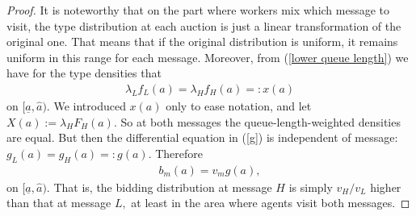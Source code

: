 \documentclass[12pt]{article}
\begin{document}
\begin{proof}
It is noteworthy that on the part where workers mix which message to visit, the type distribution at each auction is just a linear transformation of the original one.
That means that if the original distribution is uniform, it remains uniform in this range for each message.
Moreover, from (\ref{lower queue length}) we have for the type densities that 
\begin{align*}
\lambda _{L}f_{L}(a)=\lambda _{H}f_{H}(a)=:x(a) 
\end{align*}
on $[\underline{a},\hat{a}).$
We introduced $x(a)$ only to ease notation, and let $X(a):=\lambda _{H}F_{H}(a).$
So at both messages the queue-length-weighted densities are equal.
But then the differential equation in (\ref{g}) is independent of message: $g_{L}(a)=g_{H}(a)=:g(a).$
Therefore
\begin{align}
b_{m}(a)=v_{m}g(a), 
\end{align}
on $[\underline{a},\hat{a}).$
That is, the bidding distribution at message $H $ is simply $v_{H}/v_{L}$ higher than that at message $L,$ at least in the area where agents visit both messages.
\end{proof}
\end{document}
